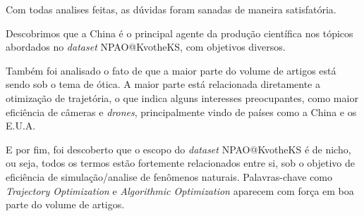     Com todas analises feitas, as dúvidas foram sanadas de maneira satisfatória. 
    
    Descobrimos que a China é o principal agente da produção científica nos tópicos abordados no \emph{dataset} NPAO@KvotheKS, com objetivos diversos.
    
    Também foi analisado o fato de que a maior parte do volume de artigos está sendo sob o tema de ótica. A maior parte está relacionada diretamente a otimização de trajetória, o que indica alguns interesses preocupantes, como maior eficiência de câmeras e \emph{drones}, principalmente vindo de países como a China e os E.U.A.
    
    E por fim, foi descoberto que o escopo do \emph{dataset} NPAO@KvotheKS é de nicho, ou seja, todos os termos estão fortemente relacionados entre si, sob o objetivo de eficiência de simulação/analise de fenômenos naturais. Palavras-chave como \emph{Trajectory Optimization} e \emph{Algorithmic Optimization} aparecem com força em boa parte do volume de artigos.